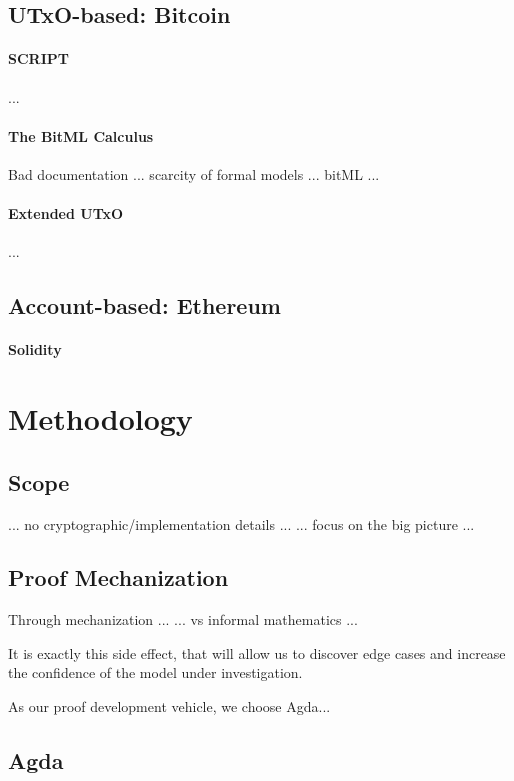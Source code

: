 \documentclass[acmsmall,nonacm=true,screen=true]{acmart}\settopmatter{printfolios=false,printccs=false,printacmref=false}
\newcommand\todocite[0]{}
\begin{document}
\subsection{UTxO-based: Bitcoin}
\paragraph{\textsc{SCRIPT}}
...

\paragraph{The BitML Calculus}
Bad documentation ... scarcity of formal models ... bitML ...

\paragraph{Extended UTxO}
... 

\subsection{Account-based: Ethereum}
\paragraph{Solidity}

\section{Methodology}
\label{sec:methodology}

\subsection{Scope}
... no cryptographic/implementation details ...
... focus on the big picture ...

\subsection{Proof Mechanization}
Through mechanization ...
... vs informal mathematics ...

It is exactly this side effect, that will allow us
to discover edge cases and increase the confidence
of the model under investigation.

As our proof development vehicle, we choose Agda\todocite ...

\subsection{Agda}
\end{document}
